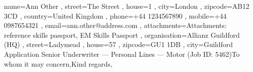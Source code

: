 \documentclass[a4paper, 12pt]{classycv}
\begin{document}
\begin{CoverLetter}[%
	submitter information line color=none%
	, recipient information line color=none%
	, has body separator=no%
	, has footer separator=no%
]{%
	name=Ann Other%
	, street=The Street%
	, house=1%
	, city=London%
	, zipcode=AB12 3CD%
	, country=United Kingdom%
	, phone=+44 1234567890%
	, mobile=+44 0987654321%
	, email=ann.other@address.com%
	, attachments={Attachments: reference skills passport, EM Skills Passport}
}{%
	, organisation=Allianz Guildford (HQ)%
	, street=Ladymead%
	, house=57%
	, zipcode=GU1 1DB%
	, city=Guildford%
}{Application Senior Underwriter --- Personal Lines --- Motor (Job ID: 5462)}{To whom it may concern,}{Kind regards,}%
\blindtext[1]%

\blindtext[2]%

\blindtext[1]%
\end{CoverLetter}
%
%
\end{document}
